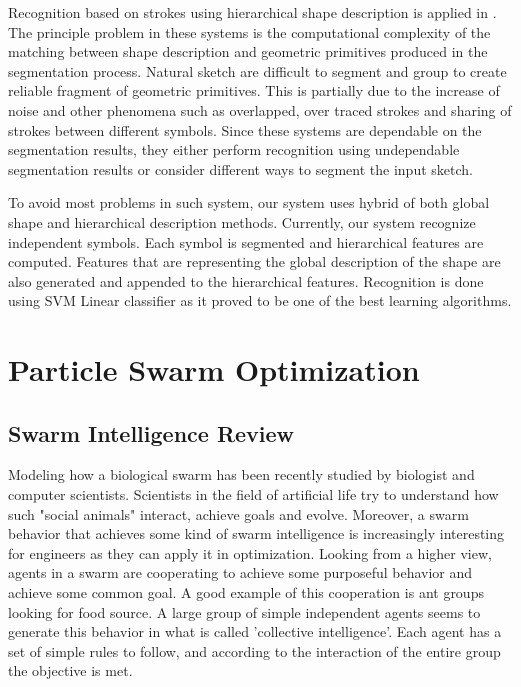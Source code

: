 Recognition based on strokes using hierarchical shape description is applied in \cite{SketchRead2007}. The principle problem in these systems is the computational complexity of the matching between shape description and geometric primitives produced in the segmentation process. Natural sketch are difficult to segment and group to create reliable fragment of geometric primitives. This is partially due to the increase of noise and other phenomena such as overlapped, over traced strokes and sharing of strokes between different symbols. Since these systems are dependable on the segmentation results, they either perform recognition using undependable segmentation results or consider different ways to segment the input sketch. 

To avoid most problems in such system, our system uses hybrid of both global shape and hierarchical description methods. Currently, our system recognize independent symbols. Each symbol is segmented and hierarchical features are computed.  Features that are representing the global description of the shape are also generated and appended to the hierarchical features. Recognition is done using SVM Linear classifier as it proved to be one of the best learning algorithms. 
\chapter{Particle Swarm Optimization}
\label{sec:ParticleSwramOptimization}

\section{Swarm Intelligence Review}
\label{sec:ParticleSwramOptimizationReview}

 Modeling how a biological swarm has been recently studied by biologist and computer scientists. Scientists in the field of artificial life try to understand how such "social animals" interact, achieve goals and evolve. Moreover, a swarm behavior that achieves some kind of swarm intelligence is increasingly interesting for engineers as they can apply it in optimization. Looking from a higher view, agents in a swarm are cooperating to achieve some purposeful behavior and achieve some common goal. A good example of this cooperation is ant groups looking for food source. A large group of simple independent agents seems to generate this behavior in what is called 'collective intelligence'. Each agent has a set of simple rules to follow, and according to the interaction of the entire group the objective is met\cite{swarmGeneral}. %

